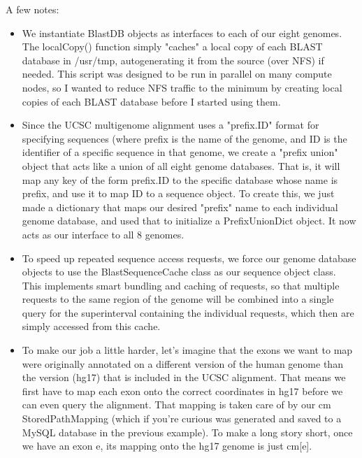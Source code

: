 \documentclass{howto}
\begin{document}
A few notes:

\begin{itemize}

\item
We instantiate BlastDB objects as interfaces to each of our eight genomes.  The localCopy() function simply "caches" a local copy of each BLAST database in /usr/tmp, autogenerating it from the source (over NFS) if needed.  This script was designed to be run in parallel on many compute nodes, so I wanted to reduce NFS traffic to the minimum by creating local copies of each BLAST database before I started using them.

\item 
Since the UCSC multigenome alignment uses a "prefix.ID" format for specifying sequences (where prefix is the name of the genome, and ID is the identifier of a specific sequence in that genome, we create a "prefix union" object that acts like a union of all eight genome databases.  That is, it will map any key of the form prefix.ID to the specific database whose name is prefix, and use it to map ID to a sequence object.  To create this, we just made a dictionary that maps our desired "prefix" name to each individual genome database, and used that to initialize a PrefixUnionDict object.  It now acts as our interface to all 8 genomes.

\item
To speed up repeated sequence access requests, we force our genome database objects to use the BlastSequenceCache class as our sequence object class.  This implements smart bundling and caching of requests, so that multiple requests to the same region of the genome will be combined into a single query for the superinterval containing the individual requests, which then are simply accessed from this cache.

\item
To make our job a little harder, let's imagine that the exons we want to map were originally annotated on a different version of the human genome than the version (hg17) that is included in the UCSC alignment.  That means we first have to map each exon onto the correct coordinates in hg17 before we can even query the alignment.  That mapping is taken care of by our cm StoredPathMapping (which if you're curious was generated and saved to a MySQL database in the previous example).  To make a long story short, once we have an exon e, its mapping onto the hg17 genome is just cm[e].


\end{itemize}
\end{document}

